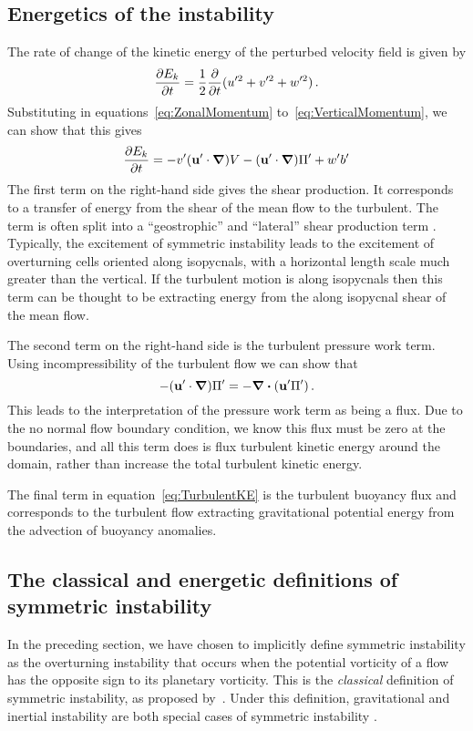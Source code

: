     \subsection{Energetics of the instability}
    The rate of change of the kinetic energy of the perturbed velocity field is given by
    \begin{equation}
        \label{eq:TurbulentKE}
        \pdv{E_k}{t} = \frac{1}{2}\frac{\partial}{\partial t} (u'^2 + v'^2 + w'^2) \, .
    \end{equation}
    Substituting in equations~\ref{eq:ZonalMomentum} to~\ref{eq:VerticalMomentum}, we can show that this gives
    \begin{equation}
        \pdv{E_k}{t} = - v' (\mathbf{u}'\cdot \grad) V - (\mathbf{u}'\cdot \grad) \Pi ' + w' b' 
    \end{equation}
    The first term on the right-hand side gives the shear production. It corresponds to a transfer of energy from the shear of the mean flow to the turbulent. The term is often split into a ``geostrophic'' and ``lateral'' shear production term \citep{Haine1998, Thomas2013, Grisouard2018}. Typically, the excitement of symmetric instability leads to the excitement of overturning cells oriented along isopycnals, with a horizontal length scale much greater than the vertical. If the turbulent motion is along isopycnals then this term can be thought to be extracting energy from the along isopycnal shear of the mean flow.
    
    The second term on the right-hand side is the turbulent pressure work term. Using incompressibility of the turbulent flow we can show that
    \begin{equation}
       - (\mathbf{u}'\cdot \grad) \Pi ' = - \div{(\mathbf{u'}\Pi ')} \, .
    \end{equation}
    This leads to the interpretation of the pressure work term as being a flux. Due to the no normal flow boundary condition, we know this flux must be zero at the boundaries, and all this term does is flux turbulent kinetic energy around the domain, rather than increase the total turbulent kinetic energy.
    
    The final term in equation~\ref{eq:TurbulentKE} is the turbulent buoyancy flux and corresponds to the turbulent flow extracting gravitational potential energy from the advection of buoyancy anomalies.

    \subsection{The classical and energetic definitions of symmetric instability}
    In the preceding section, we have chosen to implicitly define symmetric instability as the overturning instability that occurs when the potential vorticity of a flow has the opposite sign to its planetary vorticity. This is the \textit{classical} definition of symmetric instability, as proposed by~\citet{Hoskins1974}. Under this definition, gravitational and inertial instability are both special cases of symmetric instability \citep{Xu1985}. 
    
